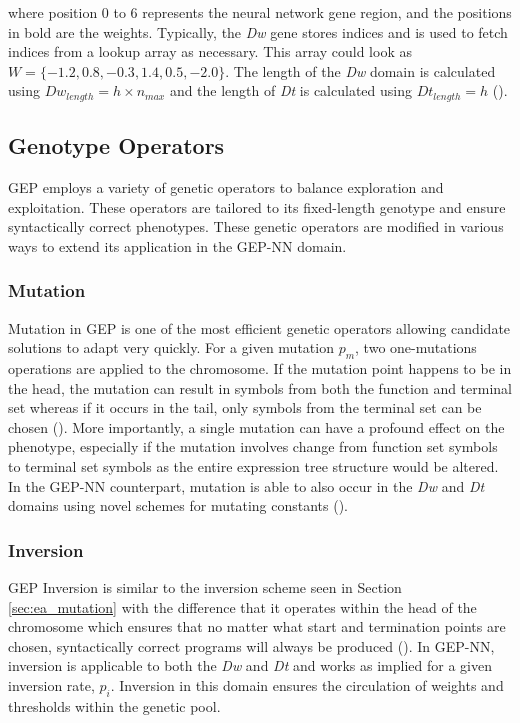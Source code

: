 \noindent where position 0 to 6 represents the neural network gene region, and the positions in bold are the weights. Typically, the \textit{Dw} gene stores indices and is used to fetch indices from a lookup array as necessary. This array could look as \textit{$W = \{-1.2, 0.8, -0.3, 1.4, 0.5, -2.0\}$}. The length of the \textit{Dw} domain is calculated using \textit{$Dw_{length} = h \times n_{max}$} and the length of \textit{Dt} is calculated using \textit{$Dt_{length} = h$} (\cite{ferreira2006gene}).


\subsection{Genotype Operators}\label{sec:gep_genetic_operators}
GEP employs a variety of genetic operators to balance exploration and exploitation. These operators are tailored to its fixed-length genotype and ensure syntactically correct phenotypes. These genetic operators are modified in various ways to extend its application in the GEP-NN domain.

\subsubsection{Mutation}
Mutation in GEP is one of the most efficient genetic operators allowing candidate solutions to adapt very quickly. For a given mutation $p_m$, two one-mutations operations are applied to the chromosome. If the mutation point happens to be in the head, the mutation can result in symbols from both the function and terminal set whereas if it occurs in the tail, only symbols from the terminal set can be chosen (\cite{ferreira2006gene}). More importantly, a single mutation can have a profound effect on the phenotype, especially if the mutation involves change from function set symbols to terminal set symbols as the entire expression tree structure would be altered. In the GEP-NN counterpart, mutation is able to also occur in the \textit{Dw} and \textit{Dt} domains using novel schemes for mutating constants (\cite{ferreira2006gene}).

\subsubsection{Inversion}
GEP Inversion is similar to the inversion scheme seen in Section \ref{sec:ea_mutation} with the difference that it operates within the head of the chromosome which ensures that no matter what start and termination points are chosen, syntactically correct programs will always be produced (\cite{ferreira2006gene}). In GEP-NN, inversion is applicable to both the \textit{Dw} and \textit{Dt} and works as implied for a given inversion rate, \textit{$p_i$}. Inversion in this domain ensures the circulation of weights and thresholds within the genetic pool.

